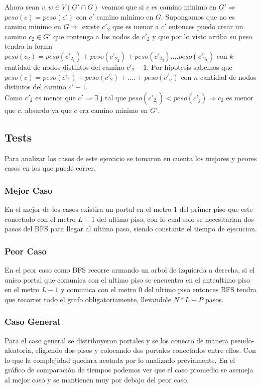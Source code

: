         Ahora sean $v, w \in V(G' \cap G)$ veamos que si $c$ es camino minimo en $G' \Rightarrow$ $peso(c) = peso(c')$ con $c'$ camino minimo en $G$. Supongamos que no es camino minimo en $G \Rightarrow$ existe $c'_2$ que es menor a $c'$ entonces puedo crear un camino $c_2 \in G'$ que contenga a los nodos de $c'_2$ y que por lo visto arriba su peso tendra la forma $peso(c_2) = peso(c'_{2_1}) + peso(c'_{2_2}) + peso(c'_{2_3}) .... peso(c'_{2_k})$ con $k$ cantidad de nodos distintos del camino $c'_2 - 1$.
        Por hipotesis sabemos que $peso(c) = peso(c'_1) + peso(c'_2) + .... + peso(c'_n)$ con $n$  cantidad de nodos distintos del camino $c' - 1$. \\
        Como $c'_2$ es menor que $c' \Rightarrow \exists$ j tal que $peso(c'_{2_j}) < peso (c'_j) \Rightarrow c_2$ es menor que $c$. absurdo ya que $c$ era camino minimo en $G'$.
        
\pagebreak        
\subsection{Tests}
    Para analizar los casos de este ejercicio se tomaron en cuenta los mejores y peores casos en los que puede correr. 
    \subsubsection{Mejor Caso}
        En el mejor de los casos existira un portal en el metro $1$ del primer piso que este conectado con el metro $L-1$ del ultimo piso, con lo cual solo se necesitarian dos pasos del BFS para llegar al ultimo paso, siendo constante el tiempo de ejecucion.
        
        
    \subsubsection{Peor Caso}
        En el peor caso como BFS recorre armando un arbol de izquierda a derecha, si el unico portal que comunica con el ultimo piso se encuentra en el anteultimo piso en el metro $L-1$ y comunica con el metro $0$ del ultimo piso entonces BFS tendra que recorrer todo el grafo obligatoriamente, llevandole $N*L + P$ pasos.
        
        
    \subsubsection{Caso General}
        Para el caso general se distribuyeron portales y se los conecto de manera pseudo-aleatoria, eligiendo dos pisos y colocando dos portales conectados entre ellos. Con lo que la complejidad quedara acotada por lo analizado previamente. En el gr\'afico de comparaci\'on de tiempos podemos ver que el caso promedio se asemeja al mejor caso y se mantienen muy por debajo del peor caso.
        


